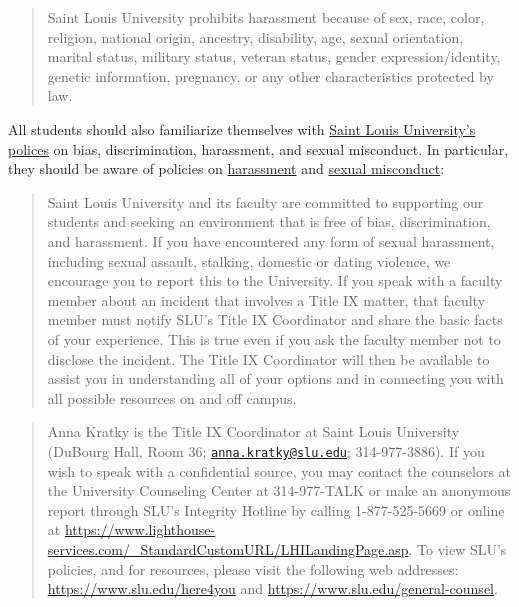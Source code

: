 \documentclass[
]{book}
\begin{document}
\begin{quote}
Saint Louis University prohibits harassment because of sex, race, color, religion, national origin, ancestry, disability, age, sexual orientation, marital status, military status, veteran status, gender expression/identity, genetic information, pregnancy, or any other characteristics protected by law.
\end{quote}

All students should also familiarize themselves with \href{http://www.slu.edu/general-counsel/institutional-equity-diversity/}{Saint Louis University's polices} on bias, discrimination, harassment, and sexual misconduct. In particular, they should be aware of policies on \href{http://www.slu.edu/general-counsel/institutional-equity-diversity/harassment.php}{harassment} and \href{https://www.slu.edu/about/safety/sexual-assault-resources.php}{sexual misconduct}:

\begin{quote}
Saint Louis University and its faculty are committed to supporting our students and seeking an environment that is free of bias, discrimination, and harassment. If you have encountered any form of sexual harassment, including sexual assault, stalking, domestic or dating violence, we encourage you to report this to the University. If you speak with a faculty member about an incident that involves a Title IX matter, that faculty member must notify SLU's Title IX Coordinator and share the basic facts of your experience. This is true even if you ask the faculty member not to disclose the incident. The Title IX Coordinator will then be available to assist you in understanding all of your options and in connecting you with all possible resources on and off campus.
\end{quote}

\begin{quote}
Anna Kratky is the Title IX Coordinator at Saint Louis University (DuBourg Hall, Room 36; \href{mailto:anna.kratky@slu.edu}{\nolinkurl{anna.kratky@slu.edu}}; 314-977-3886). If you wish to speak with a confidential source, you may contact the counselors at the University Counseling Center at 314-977-TALK or make an anonymous report through SLU's Integrity Hotline by calling 1-877-525-5669 or online at \url{https://www.lighthouse-services.com/_StandardCustomURL/LHILandingPage.asp}. To view SLU's policies, and for resources, please visit the following web addresses: \url{https://www.slu.edu/here4you} and \url{https://www.slu.edu/general-counsel}.
\end{quote}
\end{document}

